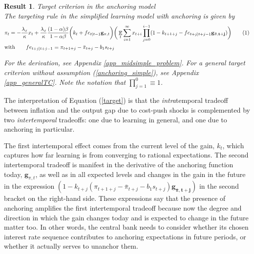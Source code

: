\documentclass[11pt]{article}
\renewcommand{\[}{\begin{equation}}
\renewcommand{\]}{\end{equation}}
\newtheorem{result}{Result}
\DeclareMathOperator{\E}{\mathbb{E}}
\newcommand\numberthis{\addtocounter{equation}{1}\tag{\theequation}} %
\begin{document}
\begin{result} Target criterion in the anchoring model \\
The targeting rule in the simplified learning model with anchoring is given by
\begin{align*}
& \pi_t = -\frac{\lambda_x}{\kappa}x_t + \frac{\lambda_x}{\kappa}\frac{(1-\alpha)\beta}{1-\alpha\beta} \bigg(k_t+fe_{t|t-1}\mathbf{g}_{\pi,t} \bigg)\bigg(\E_t\sum_{i=1}^{\infty}x_{t+i}\prod_{j=0}^{i-1}(1-k_{t+1+j} - fe_{t+j|t+j-1}\mathbf{g_{\bar{\pi},t+j}}) \bigg)
 \numberthis \label{target} \\
 & \text{with} \quad \quad fe_{t+j|t+j-1} = \pi_{t+1+j} - \bar{\pi}_{t+j}-b_1 s_{t+j}
\end{align*}

For the derivation, see Appendix \ref{app_midsimple_problem}. For a general target criterion without assumption (\ref{anchoring_simple}), see Appendix \ref{app_generalTC}. Note the notation that $\prod_{j=1}^{0} \equiv 1$.
\label{result_target_anchoring}
\end{result}
The interpretation of Equation (\ref{target}) is that the \emph{intra}temporal tradeoff between inflation and the output gap due to cost-push shocks is complemented by two \emph{intertemporal} tradeoffs: one due to learning in general, and one due to anchoring in particular. 

The first intertemporal effect comes from the current level of the gain,  $k_t$, which captures how far learning is from converging to rational expectations. The second intertemporal tradeoff is manifest in the derivative of the anchoring function today,  $\mathbf{g}_{\pi,t}$, as well as in all expected levels and changes in the gain in the future in the expression $(1-k_{t+j}(\pi_{t+1+j} - \bar{\pi}_{t+j}-b_1 s_{t+j})\mathbf{g_{\bar{\pi},t+j}})$ in the second bracket on the right-hand side. These expressions say that the presence of anchoring amplifies the first intertemporal tradeoff because now the degree and direction in which the gain changes today and is expected to change in the future matter too. In other words, the central bank needs to consider whether its chosen interest rate sequence contributes to anchoring expectations in future periods, or whether it actually serves to unanchor them.
\end{document}
